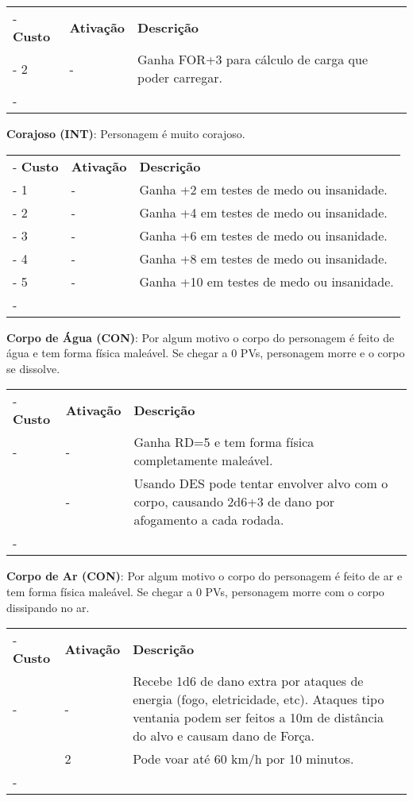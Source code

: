 \begin{small}
	\begin{tabu}{|X[c]|X[c]|X[3]|} \tabucline-
		\textbf{Custo} 	& \textbf{Ativação}	&	\textbf{Descrição} \\ \tabucline-
		2	& 	-			& Ganha FOR+3 para cálculo de carga que poder carregar. \\ \tabucline-
	\end{tabu}


\textbf{Corajoso (INT)}: Personagem é muito corajoso.

	\begin{tabu}{|X[c]|X[c]|X[3]|} \tabucline-
		\textbf{Custo} 	& \textbf{Ativação}	&	\textbf{Descrição} \\ \tabucline-
		1	& 	-			& Ganha +2 em testes de medo ou insanidade. \\ \tabucline-
		2	& 	-			& Ganha +4 em testes de medo ou insanidade. \\ \tabucline-
		3	& 	-			& Ganha +6 em testes de medo ou insanidade. \\ \tabucline-
		4	& 	-			& Ganha +8 em testes de medo ou insanidade. \\ \tabucline-
		5	& 	-			& Ganha +10 em testes de medo ou insanidade. \\ \tabucline-
	\end{tabu}


\textbf{Corpo de Água (CON)}: Por algum motivo o corpo do personagem é feito de água e tem forma física maleável. Se chegar a 0 PVs, personagem morre e o corpo se dissolve. 

	\begin{tabu}{|X[c]|X[c]|X[3]|} \tabucline-
		\textbf{Custo} 	& \textbf{Ativação}	&	\textbf{Descrição} \\ \tabucline-
			& 	-	& Ganha RD=5 e tem forma física completamente maleável. \\ 
							& 	-	& Usando DES pode tentar envolver alvo com o corpo, causando 2d6+3 de dano por afogamento a cada rodada. \\ \tabucline-
	\end{tabu}


\textbf{Corpo de Ar (CON)}: Por algum motivo o corpo do personagem é feito de ar e tem forma física maleável. Se chegar a 0 PVs, personagem morre com o corpo dissipando no ar. 

	\begin{tabu}{|X[c]|X[c]|X[3]|} \tabucline-
	\textbf{Custo} 	& \textbf{Ativação}	&	\textbf{Descrição} \\ \tabucline-
		& 	-	& Recebe 1d6 de dano extra por ataques de energia (fogo, eletricidade, etc). Ataques tipo ventania podem ser feitos a 10m de distância do alvo e causam dano de Força.\\ 
						& 	2	& Pode voar até 60 km/h por 10 minutos. \\ \tabucline-
	\end{tabu}



\end{small}
